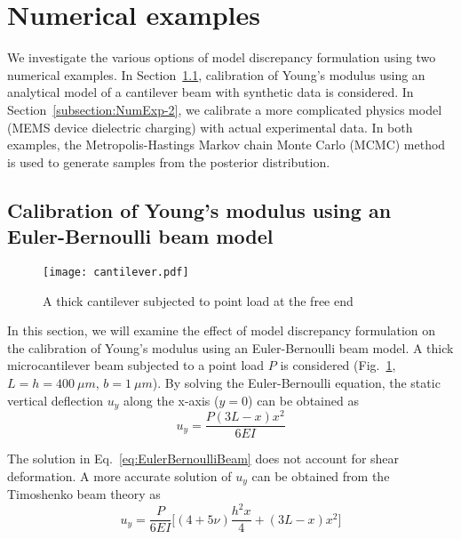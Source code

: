 \documentclass[preprint,review,12pt,3p]{elsarticle}
\begin{document}
\section{Numerical examples}\label{section:NumExp}
We investigate the various options of model discrepancy formulation using two numerical examples. In Section~\ref{subsection:NumExp-1}, calibration of Young's modulus using an analytical model of a cantilever beam with synthetic data is considered. In Section~\ref{subsection:NumExp-2}, we calibrate a more complicated physics model (MEMS device dielectric charging) with actual experimental data. In both examples, the Metropolis-Hastings Markov chain Monte Carlo (MCMC) method~\citep{Hastings1970} is used to generate samples from the posterior distribution.

\subsection{Calibration of Young's modulus using an Euler-Bernoulli beam model}\label{subsection:NumExp-1}
%
\begin{figure}[h!]
\centering
\texttt{[image: cantilever.pdf]}
\label{figure:cantilever}
\caption{A thick cantilever subjected to point load at the free end}
\end{figure}

In this section, we will examine the effect of model discrepancy formulation on the calibration of Young's modulus using an Euler-Bernoulli beam model. A thick microcantilever beam subjected to a point load $P$ is considered (Fig.~\ref{figure:cantilever}, $L=h=400\ \mu m$, $b=1\ \mu m$). By solving the Euler-Bernoulli equation, the static vertical deflection $u_y$ along the x-axis ($y=0$) can be obtained as~\citep{Gere2009}
\begin{equation}\label{eq:EulerBernoulliBeam}
u_y = \frac{P(3L-x)x^2}{6EI}
\end{equation}

The solution in Eq.~\ref{eq:EulerBernoulliBeam} does not account for shear deformation. A more accurate solution of $u_y$ can be obtained from the Timoshenko beam theory as~\citep{Timoshenko1970,Augarde2008}
\begin{equation}\label{eq:TimoshenkoBeam}
u_y = \frac{P}{6EI} \Big[(4+5\nu)\frac{h^2 x}{4}+(3L-x)x^2 \Big]
\end{equation}
\end{document}
